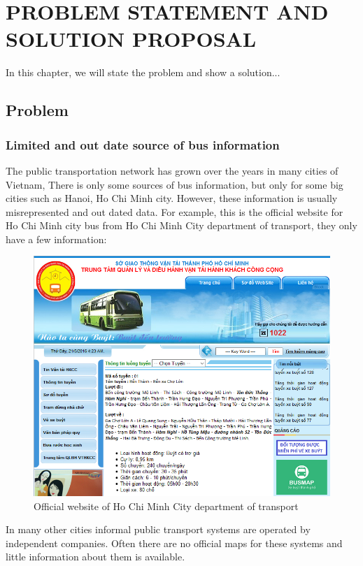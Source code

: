 \chapter{PROBLEM STATEMENT AND SOLUTION PROPOSAL}
\label{ch:chap2}
In this chapter, we will state the problem and show a solution...
\section{Problem}
\subsection{Limited and out date source of bus information}
	The public transportation network has grown over the years in many cities of Vietnam,
	There is only some sources of bus information, but only for some big cities such as Hanoi, Ho Chi Minh city. However, these information is usually misrepresented and out dated data.
	For example, this is the official website for Ho Chi Minh city bus from Ho Chi Minh City department of transport, they only have a few information:
	\begin{figure}[H]
		\centering
		\includegraphics[scale=0.5]{Chapters/Fig/buyttphcm-official}
		\caption{Official website of Ho Chi Minh City department of transport}
		\label{fig:official_website_of_HCMC_department_of_transport}
	\end{figure}
	In many other cities informal public transport systems are operated by independent companies. Often there are no official maps for these systems and little information about them is available.
